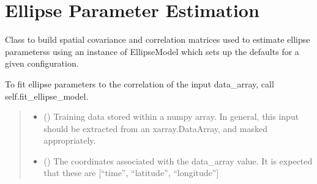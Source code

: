 \documentclass[letterpaper,10pt,english]{sphinxmanual}
\begin{document}
\section{Ellipse Parameter Estimation}
\label{\detokenize{ellipse:ellipse-parameter-estimation}}

\begin{fulllineitems}
\label{\detokenize{ellipse:glomar_gridding.ellipse.EllipseBuilder}}
\pysigstartsignatures
\pysiglinewithargsret
{}
{\sphinxparamcomma {}}
{}
\pysigstopsignatures
\sphinxAtStartPar
Class to build spatial covariance and correlation matrices used to estimate
ellipse parameterss using an instance of EllipseModel which sets up the
defaults for a given configuration.

\sphinxAtStartPar
To fit ellipse parameters to the correlation of the input data\_array, call
self.fit\_ellipse\_model.
\begin{quote}\begin{description}
\begin{itemize}
\item {}
\sphinxAtStartPar
{} () \textendash{} Training data stored within a numpy array. In general, this input should
be extracted from an xarray.DataArray, and masked appropriately.

\item {}
\sphinxAtStartPar
{} () \textendash{} The coordinates associated with the data\_array value. It is expected
that these are {[}“time”, “latitude”, “longitude”{]}

\end{itemize}

\end{description}\end{quote}


\end{fulllineitems}
\end{document}
